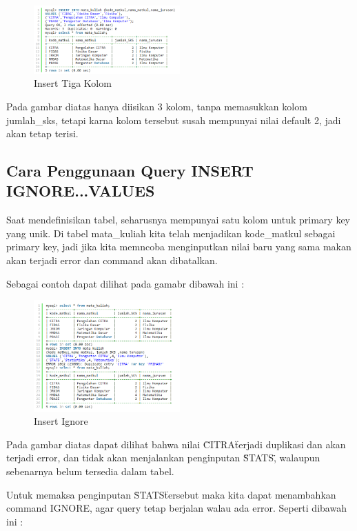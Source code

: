 		\begin{figure}[ht]
			\centerline{\includegraphics[width=0.5\textwidth]{figures/insert5.png}}
			\caption{Insert Tiga Kolom}
			\label{insert5}
			\end{figure}
			
	Pada gambar diatas hanya diisikan 3 kolom, tanpa memasukkan kolom jumlah_sks, tetapi karna kolom tersebut susah mempunyai nilai default 2, jadi akan tetap terisi.
	
	\subsection{Cara Penggunaan Query INSERT IGNORE...VALUES}
	Saat mendefinisikan tabel, seharusnya mempunyai satu kolom untuk primary key yang unik. Di tabel mata_kuliah kita telah menjadikan kode_matkul sebagai primary key, jadi jika kita memncoba menginputkan nilai baru yang sama makan akan terjadi error dan command akan dibatalkan.
	
	Sebagai contoh dapat dilihat pada gamabr dibawah ini :
	
		\begin{figure}[ht]
			\centerline{\includegraphics[width=0.5\textwidth]{figures/insert6.png}}
			\caption{Insert Ignore}
			\label{insert6}
			\end{figure}
			
	Pada gambar diatas dapat dilihat bahwa nilai \"CITRA\" terjadi duplikasi dan akan terjadi error, dan tidak akan menjalankan penginputan \"STATS\", walaupun sebenarnya belum tersedia dalam tabel.
	
	Untuk memaksa penginputan \"STATS\" tersebut  maka kita dapat menambahkan command IGNORE, agar query tetap berjalan walau ada error. Seperti dibawah ini :
	
